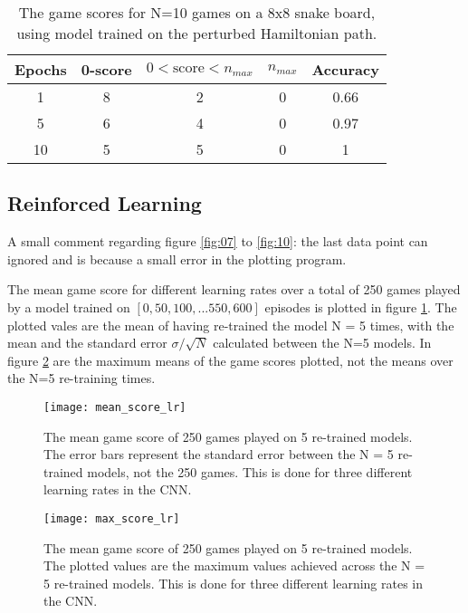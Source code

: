 \documentclass[%
 uio,
 jmp,
 amsmath,amssymb,
 reprint, nofootinbib]{revtex4-1}
\numberwithin{equation}{section}
\begin{document}
\begin{table}[H]
\caption{The game scores for N=10 games on a 8x8 snake board, using model trained on the perturbed Hamiltonian path.}
\begin{tabular}{|c|c|c|c|c|}\hline
Epochs  & 0-score & \(0<\text{score}<n_{max}\) & \(n_{max}\) & Accuracy\\ \hline
1 & 8 & 2 & 0 & 0.66\\ \hline
5 & 6 & 4 & 0 & 0.97\\ \hline
10 & 5 & 5 & 0 & 1\\ \hline
\end{tabular}
\label{tab:04}
\end{table}

\subsection{Reinforced Learning}

A small comment regarding figure \ref{fig:07} to \ref{fig:10}: the last data point can ignored and is because a small error in the plotting program.

The mean game score for different learning rates over a total of 250 games played by a model trained on \([0, 50, 100, ...550, 600]\) episodes is plotted in figure \ref{fig:05}. The plotted vales are the mean of having re-trained the model N = 5 times, with the mean and the standard error \(\sigma/\sqrt{N}\) calculated between the N=5 models. In figure \ref{fig:06} are the maximum means of the game scores plotted, not the means over the N=5 re-training times.

\begin{figure}[H]
    \centering
    \texttt{[image: mean\_score\_lr]}
    \caption{The mean game score of 250 games played on 5 re-trained models. The error bars represent the standard error between the N = 5 re-trained models, not the 250 games. This is done for three different learning rates in the CNN.}
    \label{fig:05}
\end{figure}

\begin{figure}[H]
    \centering
    \texttt{[image: max\_score\_lr]}
    \caption{The mean game score of 250 games played on 5 re-trained models. The plotted values are the maximum values achieved across the N = 5 re-trained models. This is done for three different learning rates in the CNN.}
    \label{fig:06}
\end{figure}
\end{document}
